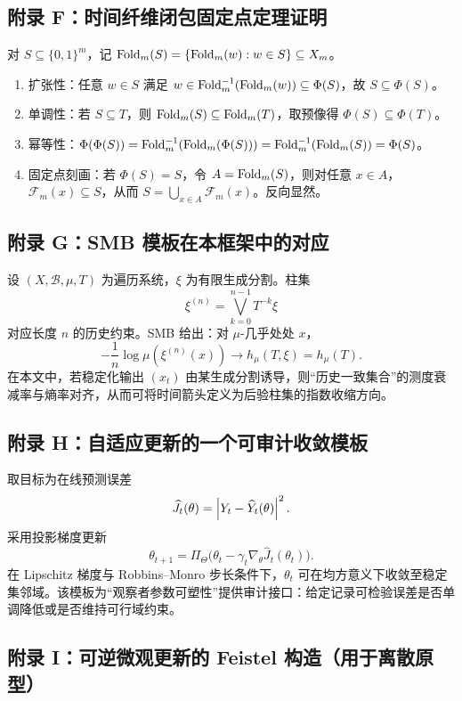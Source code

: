 \subsection{附录 F：时间纤维闭包固定点定理证明}
\label{app:closure-proof}

对 $S\subseteq\{0,1\}^m$，记 $\mathrm{Fold}_m(S)=\{\mathrm{Fold}_m(w):w\in S\}\subseteq X_m$。
\begin{enumerate}
  \item 扩张性：任意 $w\in S$ 满足 $w\in \mathrm{Fold}_m^{-1}(\mathrm{Fold}_m(w))\subseteq \Phi(S)$，故 $S\subseteq\Phi(S)$。
  \item 单调性：若 $S\subseteq T$，则 $\mathrm{Fold}_m(S)\subseteq\mathrm{Fold}_m(T)$，取预像得 $\Phi(S)\subseteq\Phi(T)$。
  \item 幂等性：$\Phi(\Phi(S))=\mathrm{Fold}_m^{-1}(\mathrm{Fold}_m(\Phi(S)))=\mathrm{Fold}_m^{-1}(\mathrm{Fold}_m(S))=\Phi(S)$。
  \item 固定点刻画：若 $\Phi(S)=S$，令 $A=\mathrm{Fold}_m(S)$，则对任意 $x\in A$，$\mathcal{F}_m(x)\subseteq S$，从而 $S=\bigcup_{x\in A}\mathcal{F}_m(x)$。反向显然。
\end{enumerate}

\subsection{附录 G：SMB 模板在本框架中的对应}
\label{app:smb}

设 $(X,\mathcal{B},\mu,T)$ 为遍历系统，$\xi$ 为有限生成分割。柱集
\[
\xi^{(n)}=\bigvee_{k=0}^{n-1}T^{-k}\xi
\]
对应长度 $n$ 的历史约束。SMB 给出：对 $\mu$-几乎处处 $x$，
\[
-\frac1n\log\mu(\xi^{(n)}(x))\to h_{\mu}(T,\xi)=h_{\mu}(T).
\]
在本文中，若稳定化输出 $(x_t)$ 由某生成分割诱导，则“历史一致集合”的测度衰减率与熵率对齐，从而可将时间箭头定义为后验柱集的指数收缩方向。

\subsection{附录 H：自适应更新的一个可审计收敛模板}
\label{app:adaptive}

取目标为在线预测误差
\[
\widehat J_t(\theta)=\left\lvert Y_t-\widehat Y_t(\theta)\right\rvert^2.
\]
采用投影梯度更新
\[
\theta_{t+1}=\Pi_{\Theta}\big(\theta_t-\gamma_t\nabla_{\theta}\widehat J_t(\theta_t)\big).
\]
在 Lipschitz 梯度与 Robbins--Monro 步长条件下，$\theta_t$ 可在均方意义下收敛至稳定集邻域。该模板为“观察者参数可塑性”提供审计接口：给定记录可检验误差是否单调降低或是否维持可行域约束。

\subsection{附录 I：可逆微观更新的 Feistel 构造（用于离散原型）}
\label{app:feistel}

